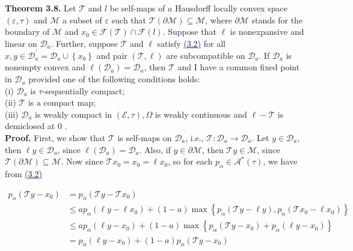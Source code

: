 \documentclass[12pt,a4paper,two side]{article}
\begin{document}
\textbf{Theorem 3.8.} Let $\mathcal{T}$ and $l$ be self-maps of $a$ Hausdorff locally convex space $(\varepsilon, \tau)$ and $\mathcal{M}$ a subset of $\varepsilon$ such that $\mathcal{T}(\partial \mathcal{M}) \subseteq \mathcal{M}$, where $\partial \mathcal{M}$ stands for the boundary of $\mathcal{M}$ and $x_0 \in \mathcal{F}(\mathcal{T}) \cap \mathcal{F}(l)$. Suppose that $\ell$ is nonexpansive and linear on $\mathcal{D}_a$. Further, suppose $\mathcal{T}$ and $\ell$ satisfy \hyperlink{dau3.2}{\textcolor{Darkblue}{(3.2)}} for all $x, y \in \mathscr{D}_a^{\prime}=\mathscr{D}_a \cup\left\{x_0\right\}$ and pair $(\mathcal{T}, \boldsymbol{\ell})$ are subcompatible on $\mathscr{D}_a$. If $\mathscr{D}_a$ is nonempty convex and $\ell\left(\mathscr{D}_a\right)=\mathscr{D}_a$, then $\mathcal{T}$ and I have a common fixed point in $\mathscr{D}_a$ provided one of the following conditions holds:\\
(i) $\mathscr{D}_a$ is $\tau$-sequentially compact;\\
(ii) $\mathcal{T}$ is a compact map;\\
(iii) $\mathscr{D}_a$ is weakly compact in $(\mathcal{E}, \tau), \Omega$ is weakly continuous and $\ell-\mathcal{T}$ is demiclosed at 0 .\\

\textbf{Proof.} First, we show that $\mathcal{T}$ is self-maps on $\mathscr{D}_a$, i.e., $\mathcal{T}: \mathscr{D}_a \rightarrow \mathscr{D}_a$. Let $y \in \mathscr{D}_a$, then $\ell y \in \mathscr{D}_a$, since $\ell\left(\mathscr{D}_a\right)=\mathscr{D}_a$. Also, if $y \in \partial \mathcal{M}$, then $\mathcal{T} y \in \mathcal{M}$, since $\mathcal{T}(\partial \mathcal{M}) \subseteq \mathcal{M}$. Now since $\mathcal{T} x_0=x_0=\ell x_0$, so for each $p_\alpha \in \mathcal{A}^*(\tau)$, we have from \hyperlink{dau3.2}{\textcolor{Darkblue}{(3.2)}}

$$
\begin{aligned}
p_\alpha\left(\mathcal{T} y-x_0\right) & =p_\alpha\left(\mathcal{T} y-\mathcal{T} x_0\right) \\
& \leq a p_\alpha\left(\ell y-\ell x_0\right)+(1-a) \max \left\{p_\alpha(\mathcal{T} y-\ell y), p_\alpha\left(\mathcal{T} x_0-\ell x_0\right)\right\} \\
& \leq a p_\alpha\left(\ell y-x_0\right)+(1-a) \max \left\{p_\alpha\left(\mathcal{T} y-x_0\right)+p_\alpha\left(\ell y-x_0\right)\right\} \\
& =p_\alpha\left(\ell y-x_0\right)+(1-a) p_\alpha\left(\mathcal{T} y-x_0\right)
\end{aligned}
$$
\end{document}
